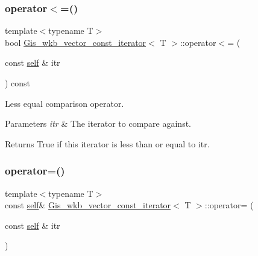 \subsubsection{\texorpdfstring{operator$<$=()}{operator<=()}}
{\footnotesize\ttfamily template$<$typename T$>$ \\
bool \mbox{\hyperlink{classGis__wkb__vector__const__iterator}{Gis\+\_\+wkb\+\_\+vector\+\_\+const\+\_\+iterator}}$<$ T $>$\+::operator$<$= (\begin{DoxyParamCaption}\item[{const \mbox{\hyperlink{classGis__wkb__vector__const__iterator}{self}} \&}]{itr }\end{DoxyParamCaption}) const\hspace{0.3cm}{\ttfamily [inline]}}



Less equal comparison operator. 


\begin{DoxyParams}{Parameters}
{\em itr} & The iterator to compare against. \\
\hline
\end{DoxyParams}
\begin{DoxyReturn}{Returns}
True if this iterator is less than or equal to itr. 
\end{DoxyReturn}
\mbox{\label{classGis__wkb__vector__const__iterator_a986cd729d4632f8c7992a424226d6cf6}} 
\subsubsection{\texorpdfstring{operator=()}{operator=()}}
{\footnotesize\ttfamily template$<$typename T$>$ \\
const \mbox{\hyperlink{classGis__wkb__vector__const__iterator}{self}}\& \mbox{\hyperlink{classGis__wkb__vector__const__iterator}{Gis\+\_\+wkb\+\_\+vector\+\_\+const\+\_\+iterator}}$<$ T $>$\+::operator= (\begin{DoxyParamCaption}\item[{const \mbox{\hyperlink{classGis__wkb__vector__const__iterator}{self}} \&}]{itr }\end{DoxyParamCaption})\hspace{0.3cm}{\ttfamily [inline]}}



